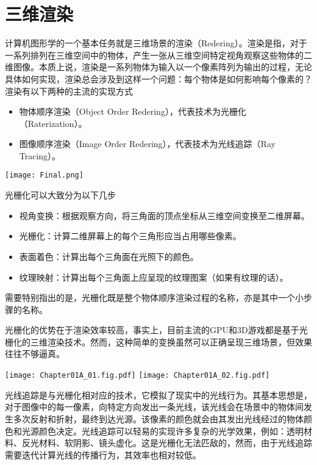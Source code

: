 \chapter{三维渲染}

计算机图形学的一个基本任务就是三维场景的渲染（Redering）。渲染是指，对于一系列排列在三维空间中的物体，产生一张从三维空间特定视角观察这些物体的二维图像。本质上说，渲染是一系列物体为输入以一个像素阵列为输出的过程，无论具体如何实现，渲染总会涉及到这样一个问题：每个物体是如何影响每个像素的？渲染有以下两种的主流的实现方式
\begin{itemize}
    \item 物体顺序渲染（Object Order Redering），代表技术为光栅化（Raterization）。
    \item 图像顺序渲染（Image Order Redering），代表技术为光线追踪（Ray Tracing）。
\end{itemize}

\begin{Figure}
    \texttt{[image: Final.png]}
\end{Figure}

光栅化可以大致分为以下几步
\begin{itemize}
    \item 视角变换：根据观察方向，将三角面的顶点坐标从三维空间变换至二维屏幕。
    \item 光栅化：计算二维屏幕上的每个三角形应当占用哪些像素。
    \item 表面着色：计算出每个三角面在光照下的颜色。
    \item 纹理映射：计算出每个三角面上应呈现的纹理图案（如果有纹理的话）。
\end{itemize}
需要特别指出的是，光栅化既是整个物体顺序渲染过程的名称，亦是其中一个小步骤的名称。\goodbreak

光栅化的优势在于渲染效率较高，事实上，目前主流的GPU和3D游戏都是基于光栅化的三维渲染技术。然而，这种简单的变换虽然可以正确呈现三维场景，但效果往往不够逼真。

\begin{Figure}
    \texttt{[image: Chapter01A\_01.fig.pdf]}
    \texttt{[image: Chapter01A\_02.fig.pdf]}
\end{Figure}

光线追踪是与光栅化相对应的技术，它模拟了现实中的光线行为。其基本思想是，对于图像中的每一像素，向特定方向发出一条光线，该光线会在场景中的物体间发生多次反射和折射，最终到达光源。该像素的颜色就会由其发出光线经过的物体颜色和光源颜色决定。光线追踪可以轻易的实现许多复杂的光学效果，例如：透明材料、反光材料、软阴影、镜头虚化。这是光栅化无法匹敌的，然而，由于光线追踪需要迭代计算光线的传播行为，其效率也相对较低。